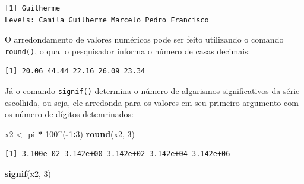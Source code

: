 \documentclass[12pt,brazil,oneside]{book}
\newenvironment{Shaded}{\begin{snugshade}}{\end{snugshade}}
\newcommand{\CommentTok}[1]{\textcolor[rgb]{0.56,0.35,0.01}{\textit{#1}}}
\newcommand{\DecValTok}[1]{\textcolor[rgb]{0.00,0.00,0.81}{#1}}
\newcommand{\KeywordTok}[1]{\textcolor[rgb]{0.13,0.29,0.53}{\textbf{#1}}}
\newcommand{\NormalTok}[1]{#1}
\newcommand{\OperatorTok}[1]{\textcolor[rgb]{0.81,0.36,0.00}{\textbf{#1}}}
\newcommand{\StringTok}[1]{\textcolor[rgb]{0.31,0.60,0.02}{#1}}
\begin{document}
\begin{Shaded}
\end{Shaded}

\begin{verbatim}
[1] Guilherme
Levels: Camila Guilherme Marcelo Pedro Francisco
\end{verbatim}

O arredondamento de valores numéricos pode ser feito utilizando o comando \texttt{round()}, o qual o pesquisador informa o número de casas decimais:

\begin{Shaded}
\end{Shaded}

\begin{verbatim}
[1] 20.06 44.44 22.16 26.09 23.34
\end{verbatim}

Já o comando \texttt{signif()} determina o número de algarismos significativos da série escolhida, ou seja, ele arredonda para os valores em seu primeiro argumento com os número de dígitos detemrinados:

\begin{Shaded}
\begin{Highlighting}[]
\NormalTok{x2 <-}\StringTok{ }\NormalTok{pi }\OperatorTok{*}\StringTok{ }\DecValTok{100}\OperatorTok{^}\NormalTok{(}\OperatorTok{-}\DecValTok{1}\OperatorTok{:}\DecValTok{3}\NormalTok{)}
\KeywordTok{round}\NormalTok{(x2, }\DecValTok{3}\NormalTok{)}
\end{Highlighting}
\end{Shaded}

\begin{verbatim}
[1] 3.100e-02 3.142e+00 3.142e+02 3.142e+04 3.142e+06
\end{verbatim}

\begin{Shaded}
\begin{Highlighting}[]
\KeywordTok{signif}\NormalTok{(x2, }\DecValTok{3}\NormalTok{) }
\end{Highlighting}
\end{Shaded}
\end{document}
